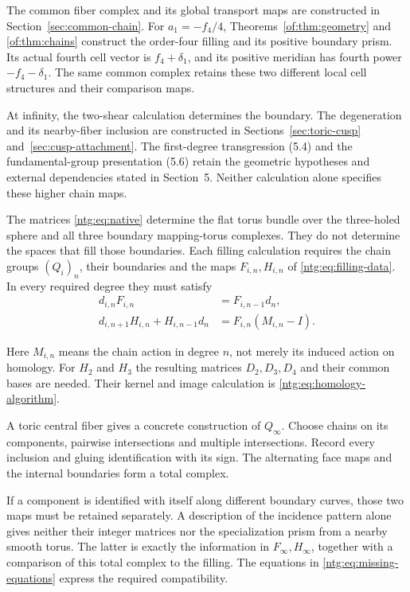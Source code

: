 The common fiber
complex and its global transport maps are constructed in
Section~\ref{sec:common-chain}. For $a_1=-f_4/4$,
Theorems~\ref{of:thm:geometry} and
\ref{of:thm:chains} construct the order-four filling and its
positive boundary prism. Its actual fourth cell vector is
$f_4+\delta_1$, and its positive meridian has fourth power
$-f_4-\delta_1$. The same common complex retains these two different
local cell structures and their comparison maps.

At infinity, the two-shear calculation determines the boundary.
The degeneration and its nearby-fiber inclusion are constructed in
Sections~\ref{sec:toric-cusp} and~\ref{sec:cusp-attachment}.
The first-degree transgression (5.4) and the
fundamental-group presentation (5.6) retain the geometric hypotheses
and external dependencies stated in Section~5. Neither calculation
alone specifies these higher chain maps.

The matrices \eqref{ntg:eq:native} determine the flat torus bundle over
the three-holed sphere and all three boundary mapping-torus complexes.
They do not determine the spaces that fill those boundaries.
Each filling calculation requires the chain groups $(Q_i)_n$,
their boundaries and the maps $F_{i,n},H_{i,n}$ of \eqref{ntg:eq:filling-data}.
In every required degree they must satisfy
\begin{equation}\label{ntg:eq:missing-equations}
 \begin{split}
 d_{i,n}F_{i,n}&=F_{i,n-1}d_n,\\
 d_{i,n+1}H_{i,n}+H_{i,n-1}d_n
     &=F_{i,n}(M_{i,n}-I).
 \end{split}
\end{equation}

Here $M_{i,n}$ means the chain action in degree $n$, not merely
its induced action on homology. For $H_2$ and $H_3$ the resulting
matrices $D_2,D_3,D_4$ and their common bases are needed. Their
kernel and image calculation is \eqref{ntg:eq:homology-algorithm}.

A toric central fiber gives a concrete construction of $Q_\infty$.
Choose chains on its components, pairwise intersections and multiple
intersections. Record every inclusion and gluing identification with its sign.
The alternating face maps and the internal boundaries form a total
complex.

If a component is identified with itself along different
boundary curves, those two maps must be retained separately. A
description of the incidence pattern alone gives neither their
integer matrices nor the specialization prism from a nearby smooth
torus. The latter is exactly the information in
$F_\infty,H_\infty$, together with a comparison of this total
complex to the filling. The equations in
\eqref{ntg:eq:missing-equations} express the required compatibility.

